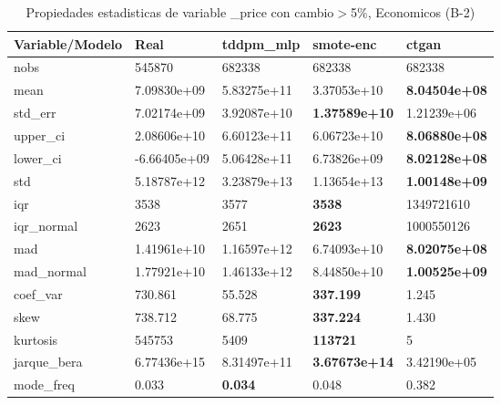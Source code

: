 \begin{table}[H]
\centering
\fontsize{8}{14}\selectfont
\caption{Propiedades estadisticas de variable \_price con cambio\ensuremath{>}5\%, Economicos (B-2)}
\label{table-stats-economicos-b-2-_price-short}
\begin{tabular}{|l|m{10em}|m{10em}|m{10em}|m{10em}|}
\hline
 \rowcolor[gray]{0.8}
Variable/Modelo & Real & tddpm\_mlp & smote-enc & ctgan \\
\hline nobs & 545870 & 682338 & 682338 & 682338 \\
\hline mean & 7.09830e+09 & \cellcolor[rgb]{0.9, 0.54, 0.52} 5.83275e+11 & 3.37053e+10 & \bfseries 8.04504e+08 \\
\hline std\_err & 7.02174e+09 & \cellcolor[rgb]{0.9, 0.54, 0.52} 3.92087e+10 & \bfseries 1.37589e+10 & 1.21239e+06 \\
\hline upper\_ci & 2.08606e+10 & \cellcolor[rgb]{0.9, 0.54, 0.52} 6.60123e+11 & 6.06723e+10 & \bfseries 8.06880e+08 \\
\hline lower\_ci & -6.66405e+09 & \cellcolor[rgb]{0.9, 0.54, 0.52} 5.06428e+11 & 6.73826e+09 & \bfseries 8.02128e+08 \\
\hline std & 5.18787e+12 & \cellcolor[rgb]{0.9, 0.54, 0.52} 3.23879e+13 & 1.13654e+13 & \bfseries 1.00148e+09 \\
\hline iqr & 3538 & 3577 & \bfseries 3538 & \cellcolor[rgb]{0.9, 0.54, 0.52} 1349721610 \\
\hline iqr\_normal & 2623 & 2651 & \bfseries 2623 & \cellcolor[rgb]{0.9, 0.54, 0.52} 1000550126 \\
\hline mad & 1.41961e+10 & \cellcolor[rgb]{0.9, 0.54, 0.52} 1.16597e+12 & 6.74093e+10 & \bfseries 8.02075e+08 \\
\hline mad\_normal & 1.77921e+10 & \cellcolor[rgb]{0.9, 0.54, 0.52} 1.46133e+12 & 8.44850e+10 & \bfseries 1.00525e+09 \\
\hline coef\_var & 730.861 & 55.528 & \bfseries 337.199 & \cellcolor[rgb]{0.9, 0.54, 0.52} 1.245 \\
\hline skew & 738.712 & 68.775 & \bfseries 337.224 & \cellcolor[rgb]{0.9, 0.54, 0.52} 1.430 \\
\hline kurtosis & 545753 & 5409 & \bfseries 113721 & \cellcolor[rgb]{0.9, 0.54, 0.52} 5 \\
\hline jarque\_bera & 6.77436e+15 & 8.31497e+11 & \bfseries 3.67673e+14 & \cellcolor[rgb]{0.9, 0.54, 0.52} 3.42190e+05 \\
\hline mode\_freq & 0.033 & \bfseries 0.034 & 0.048 & \cellcolor[rgb]{0.9, 0.54, 0.52} 0.382 \\

\end{tabular}
\end{table}
